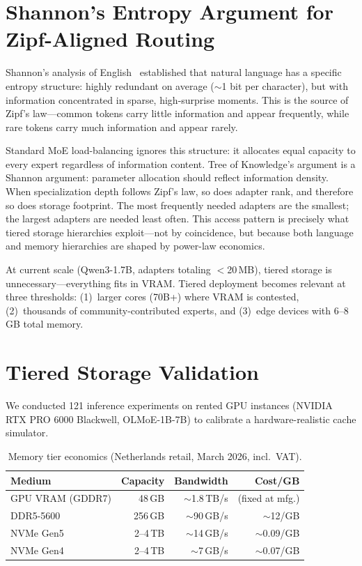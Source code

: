 \documentclass{article}
\newcommand{\tok}{Tree of Knowledge}
\begin{document}
\section{Shannon's Entropy Argument for Zipf-Aligned Routing}
\label{app:shannon}

Shannon's analysis of English~\cite{shannon1948} established that natural
language has a specific entropy structure: highly redundant on average
($\sim$1 bit per character), but with information concentrated in sparse,
high-surprise moments. This is the source of Zipf's law---common tokens carry
little information and appear frequently, while rare tokens carry much
information and appear rarely.

Standard MoE load-balancing ignores this structure: it allocates equal capacity
to every expert regardless of information content. \tok{}'s argument is a
Shannon argument: parameter allocation should reflect information density. When
specialization depth follows Zipf's law, so does adapter rank, and therefore so
does storage footprint. The most frequently needed adapters are the smallest;
the largest adapters are needed least often. This access pattern is precisely
what tiered storage hierarchies exploit---not by coincidence, but because both
language and memory hierarchies are shaped by power-law economics.

At current scale (Qwen3-1.7B, adapters totaling $<$20\,MB), tiered storage is
unnecessary---everything fits in VRAM. Tiered deployment becomes relevant at
three thresholds: (1)~larger cores (70B+) where VRAM is contested,
(2)~thousands of community-contributed experts, and (3)~edge devices with
6--8\,GB total memory.

\section{Tiered Storage Validation}
\label{app:tiered}

We conducted 121 inference experiments on rented GPU instances (NVIDIA RTX PRO
6000 Blackwell, OLMoE-1B-7B) to calibrate a hardware-realistic cache simulator.

\begin{table}[h]
\centering
\caption{Memory tier economics (Netherlands retail, March 2026, incl.\ VAT).}
\label{tab:tiers}
\begin{tabular}{@{}lrrr@{}}
\toprule
Medium & Capacity & Bandwidth & Cost/GB \\
\midrule
GPU VRAM (GDDR7) & 48\,GB & $\sim$1.8\,TB/s & (fixed at mfg.) \\
DDR5-5600 & 256\,GB & $\sim$90\,GB/s & $\sim$\texteuro{}12/GB \\
NVMe Gen5 & 2--4\,TB & $\sim$14\,GB/s & $\sim$\texteuro{}0.09/GB \\
NVMe Gen4 & 2--4\,TB & $\sim$7\,GB/s & $\sim$\texteuro{}0.07/GB \\
\bottomrule
\end{tabular}
\end{table}
\end{document}
